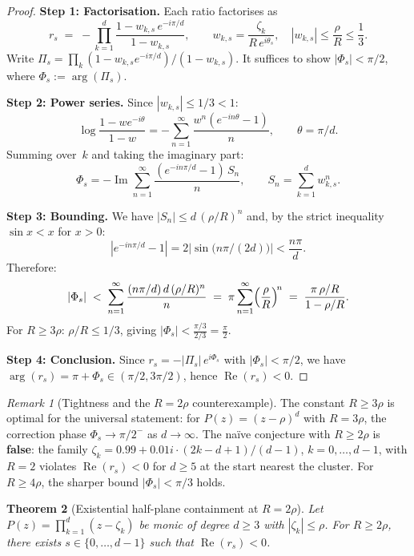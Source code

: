 \documentclass[10pt,a4paper,oneside]{book}
\newtheorem{theorem}{Theorem}[chapter]
\theoremstyle{definition}
\theoremstyle{remark}
\newtheorem{remark}[theorem]{Remark}
\begin{document}
\begin{proof}
\textbf{Step 1: Factorisation.}
Each ratio factorises as
\[
  r_s \;=\; -\prod_{k=1}^d \frac{1 - w_{k,s}\,e^{-i\pi/d}}{1 - w_{k,s}},
  \qquad w_{k,s} = \frac{\zeta_k}{R\,e^{i\theta_s}},
  \quad |w_{k,s}| \leq \frac{\rho}{R} \leq \frac{1}{3}.
\]
Write $\Pi_s = \prod_k(1-w_{k,s} e^{-i\pi/d})/(1-w_{k,s})$.  It suffices to show $|\Phi_s| < \pi/2$, where $\Phi_s := \arg(\Pi_s)$.

\smallskip
\textbf{Step 2: Power series.}
Since $|w_{k,s}| \leq 1/3 < 1$:
\[
  \log\frac{1 - w e^{-i\theta}}{1-w}
  = -\sum_{n=1}^{\infty} \frac{w^n(e^{-in\theta}-1)}{n},
  \qquad \theta = \pi/d.
\]
Summing over~$k$ and taking the imaginary part:
\[
  \Phi_s = -\operatorname{Im}\sum_{n=1}^{\infty}
  \frac{(e^{-in\pi/d}-1)\,S_n}{n},
  \qquad S_n = \sum_{k=1}^d w_{k,s}^n.
\]

\smallskip
\textbf{Step 3: Bounding.}
We have $|S_n| \leq d\,(\rho/R)^n$ and, by the strict inequality $\sin x < x$ for $x > 0$:
\[
  |e^{-in\pi/d}-1| = 2\bigl|\sin\!\bigl(n\pi/(2d)\bigr)\bigr| < \frac{n\pi}{d}.
\]
Therefore:
\[
  |\Phi_s|
  \;<\; \sum_{n=1}^{\infty}
     \frac{(n\pi/d)\,d\,(\rho/R)^n}{n}
  \;=\; \pi\sum_{n=1}^{\infty}\Bigl(\frac{\rho}{R}\Bigr)^{\!n}
  \;=\; \frac{\pi\,\rho/R}{1-\rho/R}.
\]
For $R \geq 3\rho$: $\rho/R \leq 1/3$, giving $|\Phi_s| < \frac{\pi/3}{2/3} = \frac{\pi}{2}$.

\smallskip
\textbf{Step 4: Conclusion.}
Since $r_s = -|\Pi_s|\,e^{i\Phi_s}$ with $|\Phi_s| < \pi/2$, we have $\arg(r_s) = \pi + \Phi_s \in (\pi/2, 3\pi/2)$, hence $\operatorname{Re}(r_s) < 0$.
\end{proof}

\begin{remark}[Tightness and the $R = 2\rho$ counterexample]
\label{rem:tightness}
The constant $R \geq 3\rho$ is optimal for the universal statement: for $P(z) = (z-\rho)^d$ with $R = 3\rho$, the correction phase $\Phi_s \to \pi/2^{-}$ as $d \to \infty$.  The na\"ive conjecture with $R \geq 2\rho$ is \textbf{false}: the family $\zeta_k = 0.99 + 0.01i \cdot (2k-d+1)/(d-1)$, $k = 0,\ldots,d-1$, with $R = 2$ violates $\operatorname{Re}(r_s) < 0$ for $d \geq 5$ at the start nearest the cluster.  For $R \geq 4\rho$, the sharper bound $|\Phi_s| < \pi/3$ holds.
\end{remark}

\begin{theorem}[Existential half-plane containment at $R = 2\rho$]
\label{thm:halfplane_existential}
Let $P(z) = \prod_{k=1}^d(z-\zeta_k)$ be monic of degree $d \geq 3$ with $|\zeta_k| \leq \rho$.  For $R \geq 2\rho$, there exists $s \in \{0,\ldots,d-1\}$ such that $\operatorname{Re}(r_s) < 0$.
\end{theorem}
\end{document}

